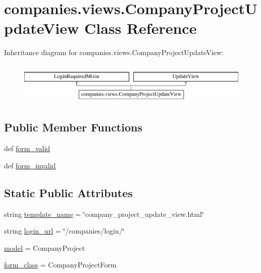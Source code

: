 \hypertarget{classcompanies_1_1views_1_1_company_project_update_view}{\section{companies.\-views.\-Company\-Project\-Update\-View Class Reference}
\label{classcompanies_1_1views_1_1_company_project_update_view}
}
Inheritance diagram for companies.\-views.\-Company\-Project\-Update\-View\-:\begin{figure}[H]
\begin{center}
\leavevmode
\includegraphics[height=2.000000cm]{classcompanies_1_1views_1_1_company_project_update_view}
\end{center}
\end{figure}
\subsection*{Public Member Functions}
\begin{DoxyCompactItemize}
\item 
def \hyperlink{classcompanies_1_1views_1_1_company_project_update_view_a05cf2e656779338470d6e21e43340f51}{form\-\_\-valid}
\item 
def \hyperlink{classcompanies_1_1views_1_1_company_project_update_view_ad04b10ab21fcdf68c17594921e00015b}{form\-\_\-invalid}
\end{DoxyCompactItemize}
\subsection*{Static Public Attributes}
\begin{DoxyCompactItemize}
\item 
string \hyperlink{classcompanies_1_1views_1_1_company_project_update_view_afce304bbe0537dece8c1bf2e546f9c18}{template\-\_\-name} = \char`\"{}company\-\_\-project\-\_\-update\-\_\-view.\-html\char`\"{}
\item 
string \hyperlink{classcompanies_1_1views_1_1_company_project_update_view_ad6b33e39a6064929efa44cf7d832bece}{login\-\_\-url} = \char`\"{}/companies/login/\char`\"{}
\item 
\hyperlink{classcompanies_1_1views_1_1_company_project_update_view_a5d8672dec0b2e79350e965b5aed383f2}{model} = Company\-Project
\item 
\hyperlink{classcompanies_1_1views_1_1_company_project_update_view_aa619899a95ac483589a6c17b17f9022c}{form\-\_\-class} = Company\-Project\-Form
\end{DoxyCompactItemize}


